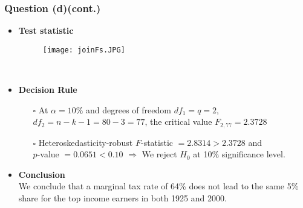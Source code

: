 \documentclass[11pt, xcolor=x11names,compress]{beamer}
\begin{document}
\begin{frame}
\frametitle{Question (d)(cont.)}
\begin{itemize}
    \item \textbf{Test statistic}   
    \begin{figure}
        \centering
        \texttt{[image: joinFs.JPG]}
    \end{figure}\\
    \item \textbf{Decision Rule}\\
    \begin{itemize}
        \item[$\square$] At $\alpha = 10\%$ and degrees of freedom $df_1 = q = 2$, $df_2 = n - k - 1 = 80 - 3 = 77$, the critical value $F_{2,77} = 2.3728$
        \item[$\square$] Heteroskedasticity-robust $F$-statistic $= 2.8314 > 2.3728$ and \\$p$-value $=0.0651 < 0.10$ $\Rightarrow$ We reject $H_0$ at 10\% significance level.
    \end{itemize}
    \item \textbf{Conclusion}\\
    We conclude that a marginal tax rate of 64\% does not lead to the same 5\% share for the top income earners in both 1925 and 2000.
\end{itemize}
\end{frame}
\end{document}
